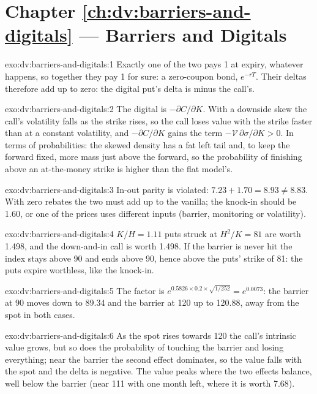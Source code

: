 \section*{Chapter \ref{ch:dv:barriers-and-digitals} --- Barriers and Digitals}

\begin{solution}{exo:dv:barriers-and-digitals:1}
Exactly one of the two pays 1 at expiry, whatever happens, so together they pay 1 for sure: a zero-coupon bond,
$e^{-rT}$. Their deltas therefore add up to zero: the digital put's delta is minus the call's.
\end{solution}

\begin{solution}{exo:dv:barriers-and-digitals:2}
The digital is $-\partial C/\partial K$. With a downside skew the call's volatility falls as the strike rises, so the call
loses value with the strike faster than at a constant volatility, and $-\partial C/\partial K$ gains the term
$-\mathcal V\,\partial\sigma/\partial K>0$. In terms of probabilities: the skewed density has a fat left tail and, to keep
the forward fixed, more mass just above the forward, so the probability of finishing above an at-the-money strike is higher
than the flat model's.
\end{solution}

\begin{solution}{exo:dv:barriers-and-digitals:3}
In-out parity is violated: $7.23+1.70=8.93\ne8.83$. With zero rebates the two must add up to the vanilla; the knock-in
should be 1.60, or one of the prices uses different inputs (barrier, monitoring or volatility).
\end{solution}

\begin{solution}{exo:dv:barriers-and-digitals:4}
$K/H=1.11$ puts struck at $H^2/K=81$ are worth 1.498, and the down-and-in call is worth 1.498. If the barrier is never hit
the index stays above 90 and ends above 90, hence above the puts' strike of 81: the puts expire worthless, like the
knock-in.
\end{solution}

\begin{solution}{exo:dv:barriers-and-digitals:5}
The factor is $e^{0.5826\times0.2\times\sqrt{1/252}}=e^{0.0073}$: the barrier at 90 moves down to 89.34 and the barrier at 120
up to 120.88, away from the spot in both cases.
\end{solution}

\begin{solution}{exo:dv:barriers-and-digitals:6}
As the spot rises towards 120 the call's intrinsic value grows, but so does the probability of touching the barrier and
losing everything; near the barrier the second effect dominates, so the value falls with the spot and the delta is
negative. The value peaks where the two effects balance, well below the barrier (near 111 with one month left, where it is worth 7.68).
\end{solution}

